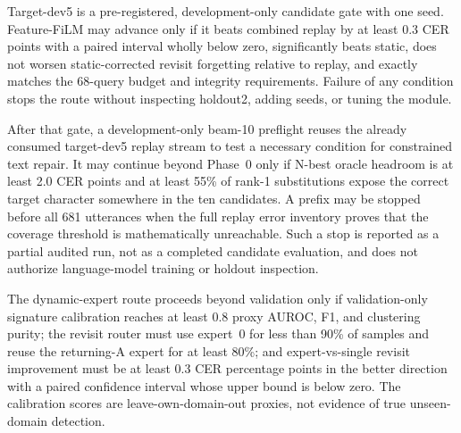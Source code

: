 Target-dev5 is a pre-registered, development-only candidate gate with one seed. Feature-FiLM may advance only if it beats combined replay by at least 0.3 CER points with a paired interval wholly below zero, significantly beats static, does not worsen static-corrected revisit forgetting relative to replay, and exactly matches the 68-query budget and integrity requirements. Failure of any condition stops the route without inspecting holdout2, adding seeds, or tuning the module.

After that gate, a development-only beam-10 preflight reuses the already consumed target-dev5 replay stream to test a necessary condition for constrained text repair. It may continue beyond Phase~0 only if N-best oracle headroom is at least 2.0 CER points and at least 55\% of rank-1 substitutions expose the correct target character somewhere in the ten candidates. A prefix may be stopped before all 681 utterances when the full replay error inventory proves that the coverage threshold is mathematically unreachable. Such a stop is reported as a partial audited run, not as a completed candidate evaluation, and does not authorize language-model training or holdout inspection.

The dynamic-expert route proceeds beyond validation only if validation-only signature calibration reaches at least 0.8 proxy AUROC, F1, and clustering purity; the revisit router must use expert~0 for less than 90\% of samples and reuse the returning-A expert for at least 80\%; and expert-vs-single revisit improvement must be at least 0.3 CER percentage points in the better direction with a paired confidence interval whose upper bound is below zero. The calibration scores are leave-own-domain-out proxies, not evidence of true unseen-domain detection.
